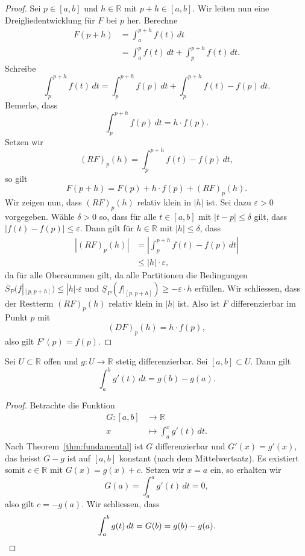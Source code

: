 \documentclass[../main.tex]{subfiles}
\begin{document}
\begin{proof}
  Sei $p \in [a, b]$ und $h \in \mathbb{R}$ 
  mit $p + h \in [a, b]$.
  Wir leiten nun eine Dreigliedentwicklung
  für $F$ bei $p$ her. Berechne
  \begin{align*}
    F(p+h)
    &= \int_{a}^{p+h} f(t) \, dt\\
    &= \int_{a}^{p} f(t) \, dt
    + \int_{p}^{p+h} f(t) \, dt.
  \end{align*}
  Schreibe
  \[
    \int_{p}^{p+h} f(t) \, dt
    = \int_{p}^{p+h} f(p) \, dt
    + \int_{p}^{p+h} f(t) - f(p) \, dt.
  \]
  Bemerke, dass
  \[
    \int_{p}^{p+h} f(p) \, dt = h \cdot f(p).
  \]
  Setzen wir
  \[
    {(RF)}_p(h) = \int_{p}^{p+h} f(t) - f(p) \, dt,
  \]
  so gilt
  \[
    F(p + h) = F(p) + h \cdot f(p) + {(RF)}_p(h).
  \]
  Wir zeigen nun, dass ${(RF)}_p(h)$ relativ klein in $|h|$ ist.
  Sei dazu $\varepsilon > 0$ vorgegeben.
  Wähle $\delta > 0$ so, dass für alle
  $t \in [a, b]$ mit $|t - p| \leq \delta$ gilt,
  dass $|f(t) - f(p)| \leq \varepsilon$.
  Dann gilt für $h \in \mathbb{R}$ mit $|h| \leq \delta$,
  dass
  \begin{align*}
    |{(RF)}_p(h)|
    & = \left| \int_{p}^{p+h} f(t) - f(p) \, dt \right|\\
    & \leq |h| \cdot \varepsilon,
  \end{align*}
  da für alle Obersummen gilt, da alle Partitionen
  die Bedingungen
  $\overline S_P(f|_{[p, p+h]}) \leq |h| \cdot \varepsilon$
  und $\underline S_P(f|_{[p, p+h]}) \geq - \varepsilon \cdot h$ 
  erfüllen.
  Wir schliessen, dass der Restterm
  ${(RF)}_p(h)$ relativ klein in $|h|$ ist.
  Also ist $F$ differenzierbar im Punkt $p$ mit
  \[
    {(DF)}_p(h) = h \cdot f(p),
  \]
  also gilt $F'(p) = f(p)$.
\end{proof}

\begin{application}
  Sei $U \subset \mathbb{R}$ offen und $g \colon U \to \mathbb{R}$ 
  stetig differenzierbar. Sei $[a, b] \subset U$.
  Dann gilt
  \[
    \int_{a}^{b} g'(t) \, dt = g(b) - g(a).
  \]
\end{application}

\begin{proof}
  Betrachte die Funktion
  \begin{align*}
    G \colon [a, b] & \to \mathbb{R} \\
    x & \mapsto \int_{a}^{x} g'(t) \, dt.
  \end{align*}
  Nach Theorem~\ref{thm:fundamental} ist $G$ differenzierbar
  und $G'(x) = g'(x)$, das heisst $G - g$ ist auf
  $[a, b]$ konstant (nach dem Mittelwertsatz).
  Es existiert somit $c \in \mathbb{R}$ mit $G(x) = g(x) + c$.
  Setzen wir $x = a $ ein, so erhalten wir
  \[
    G(a) = \int_{a}^{a} g'(t) \, dt = 0,
  \]
  also gilt $c = -g(a)$. Wir schliessen, dass
  \[
    \int_{a}^{b} g(t) \, dt = G(b) = g(b) - g(a). \qedhere
  \]
\end{proof}
\end{document}
